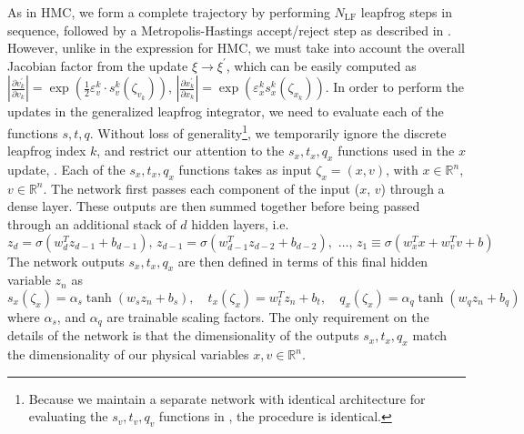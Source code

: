 \documentclass{article} %
\begin{document}
As in HMC, we form a complete trajectory by performing \(N_{\mathrm{LF}}\) leapfrog steps in sequence, followed by a
Metropolis-Hastings accept/reject step as described in .
%
However, unlike in the expression for HMC, we must take into account the overall Jacobian factor from the update
\(\xi\rightarrow\xi^{\prime}\), which can be easily computed as \(\left|\tfrac{\partial v^{\prime}_{k}}{\partial
   v_{k}}\right| = \exp{\left(\tfrac{1}{2}{\varepsilon^{k}_{v}\cdot s^{k}_{v}(\zeta_{v_{k}})}\right)}\),
   \(\left|\tfrac{\partial x^{\prime}_{k}}{\partial x_{k}}\right| = \exp{\left(\varepsilon^{k}_{x}
   s^{k}_{x}(\zeta_{x_{k}})\right)}\).
%
%
In order to perform the updates in the generalized leapfrog integrator, we need to evaluate each of the functions
\(s, t, q\).
%
Without loss of generality\footnote{%
   Because we maintain a separate network with identical architecture for evaluating the \(s_{v}, t_{v}, q_{v}\)
   functions in , the procedure is identical.
},
%
we temporarily ignore the discrete leapfrog index \(k\), and restrict our attention to the \(s_{x}, t_{x}, q_{x}\)
functions used in the \(x\) update, .
%
Each of the \(s_{x}, t_{x}, q_{x}\) functions takes as input \(\zeta_{x} = (x, v)\), with \(x\in\mathbb{R}^{n}\),
\(v\in\mathbb{R}^{n}\).
%
The network first passes each component of the input (\(x\), \(v\)) through a dense layer.
%
These outputs are then summed together before being passed through an additional stack of \(d\) hidden layers, i.e. 
%
\begin{equation}
   z_{d} = \sigma(w^{T}_{d} z_{d-1} + b_{d-1}),\,%
   z_{d-1} = \sigma(w_{d-1}^{T}z_{d-2}+b_{d-2}),\,%
   \,\ldots,\,%
   z_{1} \equiv \sigma(w_{x}^{T} x + w_{v}^{T} v + b)
\end{equation}
%
The network outputs \(s_{x}, t_{x}, q_{x}\) are then defined in terms of this final hidden variable \(z_{n}\) as
%
\begin{equation}
   s_{x}(\zeta_{x}) = \alpha_{s}\tanh(w_{s}z_{n} + b_{s}),\quad
   t_{x}(\zeta_{x}) = w_{t}^{T}z_{n} + b_{t},\quad
   q_{x}(\zeta_{x}) = \alpha_{q}\tanh(w_{q}z_{n} + b_{q})
\end{equation}
%
where \(\alpha_{s}\), and \(\alpha_{q}\) are trainable scaling factors.
%
The only requirement on the details of the network is that the dimensionality of the outputs \(s_{x}, t_{x}, q_{x}\)
match the dimensionality of our physical variables \(x, v \in\mathbb{R}^{n}\).
%
\end{document}
